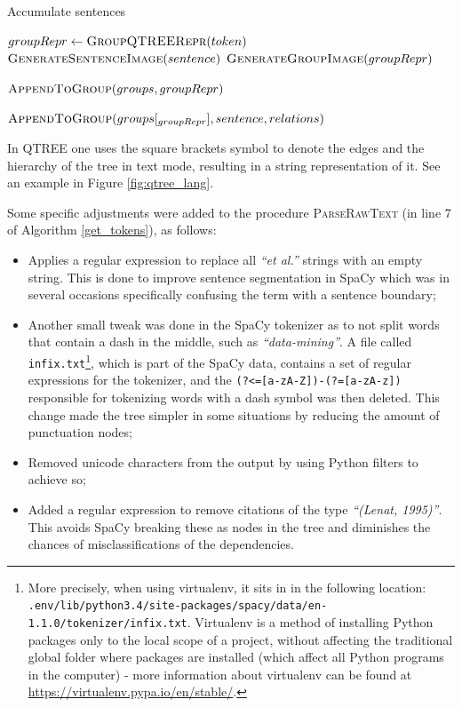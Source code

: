 \documentclass[11pt,a4paper,openright]{memoir}
\begin{document}
\begin{algorithm}[t]
  \caption{Accumulate sentences}\label{generate_representation}
  \begin{algorithmic}[1]
    
    		\State $groupRepr\gets \Call{GroupQTREERepr}{token}$ 
    		\State $\Call{GenerateSentenceImage}{sentence}$
    		\State $\Call{GenerateGroupImage}{groupRepr}$
    		
    			\State $\Call{AppendToGroup}{groups, groupRepr}$
    		\EndIf
    		
    		\State $\Call{AppendToGroup}{groups[_{groupRepr}], sentence, relations}$
    		
    \EndProcedure
    
  \end{algorithmic}
\end{algorithm}


In QTREE one uses the square brackets symbol to denote the edges and the hierarchy of the tree in text mode, resulting in a string representation of it. See an example in Figure \ref{fig:qtree_lang}.

Some specific adjustments were added to the procedure \textsc{ParseRawText} (in line 7 of Algorithm \ref{get_tokens}), as follows:
\begin{itemize}
  \item Applies a regular expression to replace all \emph{\enquote{et al.}} strings with an empty string. This is done to improve sentence segmentation in SpaCy which was in several occasions specifically confusing the term with a sentence boundary;
  \item Another small tweak was done in the SpaCy tokenizer as to not split words that contain a dash in the middle, such as \emph{\enquote{data-mining}}. A file called \texttt{infix.txt}\footnote{More precisely, when using virtualenv, it sits in in the following location: \texttt{.env/lib/python3.4/site-packages/spacy/data/en-1.1.0/tokenizer/infix.txt}. Virtualenv is a method of installing Python packages only to the local scope of a project, without affecting the traditional global folder where packages are installed (which affect all Python programs in the computer) - more information about virtualenv can be found at \url{https://virtualenv.pypa.io/en/stable/}.}, which is part of the SpaCy data, contains a set of regular expressions for the tokenizer, and the \texttt{(?<=[a-zA-Z])-(?=[a-zA-z])} responsible for tokenizing words with a dash symbol was then deleted. This change made the tree simpler in some situations by reducing the amount of punctuation nodes;
  \item Removed unicode characters from the output by using Python filters to achieve so;
  \item Added a regular expression to remove citations of the type \emph{\enquote{(Lenat, 1995)}}. This avoids SpaCy breaking these as nodes in the tree and diminishes the chances of misclassifications of the dependencies.
\end{itemize}
\end{document}
